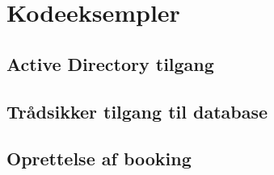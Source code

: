 \section{Kodeeksempler}
\label{Technical_CodeExamples}

\subsection{Active Directory tilgang}
\label{Technical_CodeExamples_AD}

\subsection{Trådsikker tilgang til database}
\label{Technical_CodeExamples_threadstatic}

\subsection{Oprettelse af booking}
\label{Technical_CodeExamples_bookingcreation}